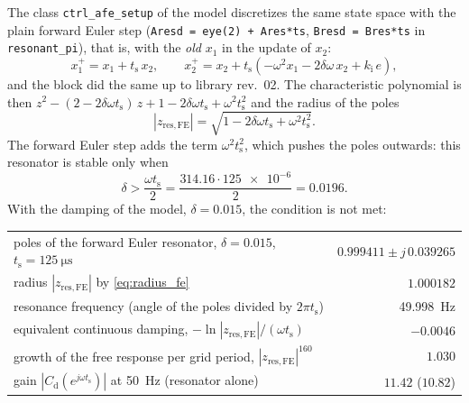 \documentclass[11pt,a4paper]{scrartcl}
\newcommand{\ped}[1]{_{\mathrm{#1}}}
\newcommand{\code}[1]{\texttt{#1}}
\begin{document}
\begin{onehalfspace}
The class \code{ctrl\_afe\_setup} of the model discretizes the same state space with the plain forward Euler step (\code{Aresd = eye(2) + Ares*ts}, \code{Bresd = Bres*ts} in \code{resonant\_pi}), that is, with the \emph{old} $x_1$ in the update of $x_2$:
\begin{equation}
	x_1^{+} = x_1 + t\ped{s}\, x_2, \qquad x_2^{+} = x_2 + t\ped{s}\left(-\omega^2 x_1 - 2\delta\omega\, x_2 + k\ped{i}\, e\right),
	\label{eq:euler}
\end{equation}
and the block did the same up to library rev.~02. The characteristic polynomial is then $z^2 - (2 - 2\delta\omega t\ped{s})\, z + 1 - 2\delta\omega t\ped{s} + \omega^2 t\ped{s}^2$ and the radius of the poles
\begin{equation}
	|z\ped{res,FE}| = \sqrt{1 - 2\delta\omega t\ped{s} + \omega^2 t\ped{s}^2}.
	\label{eq:radius_fe}
\end{equation}
The forward Euler step adds the term $\omega^2 t\ped{s}^2$, which pushes the poles outwards: this resonator is stable only when
\begin{equation}
	\delta > \frac{\omega t\ped{s}}{2} = \frac{314.16 \cdot \num{125e-6}}{2} = 0.0196.
	\label{eq:dlim}
\end{equation}
With the damping of the model, $\delta = 0.015$, the condition is not met:
\begin{center}
	\footnotesize
	\begin{tabular}{@{} l r @{}}
		\toprule
		poles of the forward Euler resonator, $\delta = 0.015$, $t\ped{s} = \SI{125}{\micro\second}$ & $0.999411 \pm j\,0.039265$ \\
		radius $|z\ped{res,FE}|$ by \eqref{eq:radius_fe} & $1.000182$ \\
		resonance frequency (angle of the poles divided by $2\pi t\ped{s}$) & \SI{49.998}{\hertz} \\
		equivalent continuous damping, $-\ln|z\ped{res,FE}|/(\omega t\ped{s})$ & $-0.0046$ \\
		growth of the free response per grid period, $|z\ped{res,FE}|^{160}$ & $1.030$ \\
		gain $|C\ped{d}(e^{j\omega t\ped{s}})|$ at \SI{50}{\hertz} (resonator alone) & $11.42$ ($10.82$) \\
		\bottomrule
	\end{tabular}
\end{center}

\end{onehalfspace}
\end{document}
